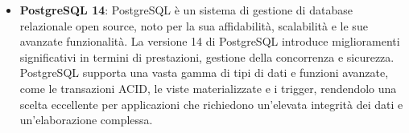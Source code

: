 \begin{itemize}
    \item \textbf{PostgreSQL 14}: PostgreSQL è un sistema di gestione di database relazionale open source, 
    noto per la sua affidabilità, scalabilità e le sue avanzate funzionalità. 
    La versione 14 di PostgreSQL introduce miglioramenti significativi in termini 
    di prestazioni, gestione della concorrenza e sicurezza. PostgreSQL supporta una vasta 
    gamma di tipi di dati e funzioni avanzate, come le transazioni ACID, le viste materializzate 
    e i trigger, rendendolo una scelta eccellente per applicazioni che richiedono un'elevata 
    integrità dei dati e un'elaborazione complessa.

\end{itemize}